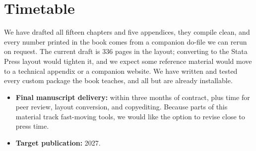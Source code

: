 \documentclass[11pt]{article}
\begin{document}
\section*{Timetable}
We have drafted all fifteen chapters and five appendices, they compile clean, and every number printed in the book comes from a companion do-file we can rerun on request. The current draft is 336 pages in the  layout; converting to the Stata Press layout would tighten it, and we expect some reference material would move to a technical appendix or a companion website. We have written and tested every custom package the book teaches, and all but  are already installable.
\begin{itemize}
    \item \textbf{Final manuscript delivery:} within three months of contract, plus time for peer review, layout conversion, and copyediting. Because parts of this material track fast-moving tools, we would like the option to revise close to press time.
    \item \textbf{Target publication:} 2027.
\end{itemize}
\end{document}
